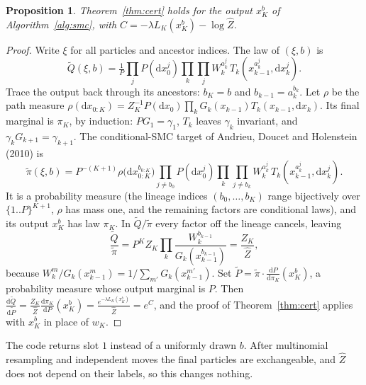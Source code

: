 \documentclass[11pt]{article}
\newtheorem{proposition}[theorem]{Proposition}
\theoremstyle{definition}
\theoremstyle{remark}
\newcommand{\Qt}{\widetilde{Q}}
\newcommand{\Pt}{\widetilde{P}}
\newcommand{\dd}{\mathrm{d}}
\begin{document}
\begin{proposition}\label{prop:smc}
Theorem~\ref{thm:cert} holds for the output $x_K^b$ of Algorithm~\ref{alg:smc}, with $C=-\lambda L_K(x_K^b)-\log\hat Z$.
\end{proposition}
\begin{proof}
Write $\xi$ for all particles and ancestor indices. The law of $(\xi,b)$ is
\[
\Qt(\xi,b)=\tfrac1P\textstyle\prod_jP(\dd x_0^j)\prod_{k}\prod_jW_k^{a_k^j}\,T_k(x_{k-1}^{a_k^j},\dd x_k^j).
\]
Trace the output back through its ancestors: $b_K=b$ and $b_{k-1}=a_k^{b_k}$. Let $\rho$ be the path measure
$\rho(\dd x_{0:K})=Z_K^{-1}P(\dd x_0)\prod_kG_k(x_{k-1})T_k(x_{k-1},\dd x_k)$. Its final marginal is $\pi_K$, by induction:
$PG_1=\gamma_1$, $T_k$ leaves $\gamma_k$ invariant, and $\gamma_kG_{k+1}=\gamma_{k+1}$. The conditional-SMC target of
Andrieu, Doucet and Holenstein (2010) is
\[
\tilde\pi(\xi,b)=P^{-(K+1)}\rho\big(\dd x_{0:K}^{b_{0:K}}\big)\textstyle\prod_{j\ne b_0}P(\dd x_0^j)\prod_k\prod_{j\ne b_k}W_k^{a_k^j}\,T_k(x_{k-1}^{a_k^j},\dd x_k^j).
\]
It is a probability measure (the lineage indices $(b_0,\dots,b_K)$ range bijectively over $\{1..P\}^{K+1}$, $\rho$ has mass
one, and the remaining factors are conditional laws), and its output $x_K^b$ has law $\pi_K$. In $\Qt/\tilde\pi$ every factor
off the lineage cancels, leaving
\[
\frac{\Qt}{\tilde\pi}=P^KZ_K\prod_k\frac{W_k^{b_{k-1}}}{G_k(x_{k-1}^{b_{k-1}})}=\frac{Z_K}{\hat Z},
\]
because $W_k^m/G_k(x_{k-1}^m)=1/\sum_{m'}G_k(x_{k-1}^{m'})$. Set $\Pt=\tilde\pi\cdot\frac{\dd P}{\dd\pi_K}(x_K^b)$, a probability
measure whose output marginal is $P$. Then
$\frac{\dd\Qt}{\dd\Pt}=\frac{Z_K}{\hat Z}\frac{\dd\pi_K}{\dd P}(x_K^b)=\frac{e^{-\lambda L_K(x_K^b)}}{\hat Z}=e^{C}$, and the proof of
Theorem~\ref{thm:cert} applies with $x_K^b$ in place of $w_K$.
\end{proof}
The code returns slot $1$ instead of a uniformly drawn $b$. After multinomial resampling and independent moves the final
particles are exchangeable, and $\hat Z$ does not depend on their labels, so this changes nothing.
\end{document}
